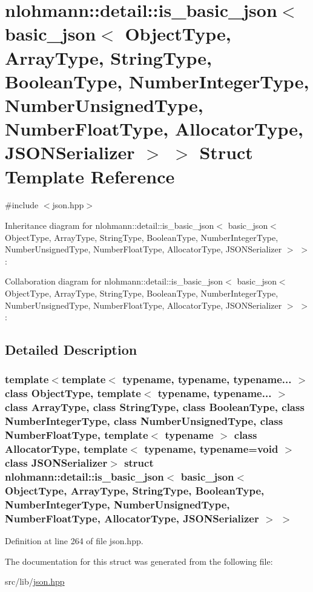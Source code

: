 \hypertarget{structnlohmann_1_1detail_1_1is__basic__json_3_01basic__json_3_01_object_type_00_01_array_type_0003b7300f70a161f2a79dcaaba1e567bb}{}\section{nlohmann\+:\+:detail\+:\+:is\+\_\+basic\+\_\+json$<$ basic\+\_\+json$<$ Object\+Type, Array\+Type, String\+Type, Boolean\+Type, Number\+Integer\+Type, Number\+Unsigned\+Type, Number\+Float\+Type, Allocator\+Type, J\+S\+O\+N\+Serializer $>$ $>$ Struct Template Reference}
\label{structnlohmann_1_1detail_1_1is__basic__json_3_01basic__json_3_01_object_type_00_01_array_type_0003b7300f70a161f2a79dcaaba1e567bb}


{\ttfamily \#include $<$json.\+hpp$>$}



Inheritance diagram for nlohmann\+:\+:detail\+:\+:is\+\_\+basic\+\_\+json$<$ basic\+\_\+json$<$ Object\+Type, Array\+Type, String\+Type, Boolean\+Type, Number\+Integer\+Type, Number\+Unsigned\+Type, Number\+Float\+Type, Allocator\+Type, J\+S\+O\+N\+Serializer $>$ $>$\+:


Collaboration diagram for nlohmann\+:\+:detail\+:\+:is\+\_\+basic\+\_\+json$<$ basic\+\_\+json$<$ Object\+Type, Array\+Type, String\+Type, Boolean\+Type, Number\+Integer\+Type, Number\+Unsigned\+Type, Number\+Float\+Type, Allocator\+Type, J\+S\+O\+N\+Serializer $>$ $>$\+:


\subsection{Detailed Description}
\subsubsection*{template$<$template$<$ typename, typename, typename... $>$ class Object\+Type, template$<$ typename, typename... $>$ class Array\+Type, class String\+Type, class Boolean\+Type, class Number\+Integer\+Type, class Number\+Unsigned\+Type, class Number\+Float\+Type, template$<$ typename $>$ class Allocator\+Type, template$<$ typename, typename=void $>$ class J\+S\+O\+N\+Serializer$>$\newline
struct nlohmann\+::detail\+::is\+\_\+basic\+\_\+json$<$ basic\+\_\+json$<$ Object\+Type, Array\+Type, String\+Type, Boolean\+Type, Number\+Integer\+Type, Number\+Unsigned\+Type, Number\+Float\+Type, Allocator\+Type, J\+S\+O\+N\+Serializer $>$ $>$}



Definition at line 264 of file json.\+hpp.



The documentation for this struct was generated from the following file\+:\begin{DoxyCompactItemize}
\item 
src/lib/\hyperlink{json_8hpp}{json.\+hpp}\end{DoxyCompactItemize}
